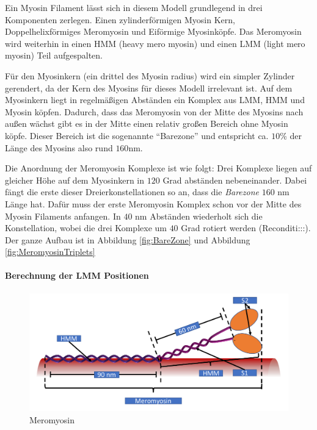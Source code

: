 \documentclass[a4paper,m]{cgBA}
\begin{document}
Ein Myosin Filament lässt sich in diesem Modell grundlegend in drei Komponenten zerlegen. Einen zylinderförmigen Myosin Kern,
Doppelhelixförmiges Meromyosin und Eiförmige Myosinköpfe. Das Meromyosin wird weiterhin in einen HMM (heavy mero myosin) und einen LMM (light mero myosin) Teil aufgespalten.

Für den Myosinkern (ein drittel des Myosin radius) wird ein simpler Zylinder gerendert, da der Kern des Myosins für dieses Modell irrelevant ist.
Auf dem Myosinkern liegt in regelmäßigen Abständen ein Komplex aus LMM, HMM und Myosin köpfen. 
Dadurch, dass das Meromyosin von der Mitte des Myosins nach außen wächst gibt es in der Mitte einen relativ großen Bereich ohne Myosin köpfe. Dieser Bereich ist die sogenannte ``Barezone'' und entspricht ca. \(10\)\% der Länge des Myosins also rund \(160\)nm.

Die Anordnung der Meromyosin Komplexe ist wie folgt:
Drei Komplexe liegen auf gleicher Höhe auf dem Myosinkern in \(120\) Grad abständen nebeneinander. Dabei fängt die erste dieser  Dreierkonstellationen so an, dass die \textit{Barezone} \(160\) nm Länge hat. Dafür muss der erste Meromyosin Komplex schon vor der Mitte des Myosin Filaments anfangen.
In \(40\) nm Abständen wiederholt sich die Konstellation, wobei die drei Komplexe um \(40\) Grad rotiert werden (Reconditi:::). Der ganze Aufbau ist in  Abbildung \ref{fig:BareZone} und Abbildung \ref{fig:MeromyosinTriplets}

\paragraph{Berechnung der LMM Positionen}

\begin{figure}[!h]
\center
\includegraphics[width=1\textwidth]{Graphics/Meromyosin.pdf}
\caption{Meromyosin}
\label{fig:Meromyosin}
\end{figure}
\end{document}
